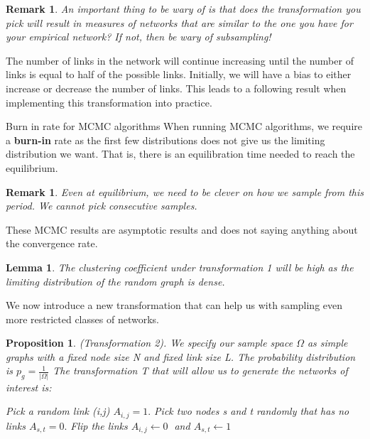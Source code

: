 \documentclass[twoside]{article}
\newtheorem{lemma}[theorem]{Lemma}
\newtheorem{proposition}[theorem]{Proposition}
\newtheorem{remark}[theorem]{Remark}
\begin{document}
\begin{remark} An important thing to be wary of is that does the transformation you pick will result in measures of networks that are similar to the one you have for your empirical network? If not, then be wary of subsampling!
\end{remark}

The number of links in the network will continue increasing until the number of links is equal to half of the possible links. Initially, we will have a bias to either increase or decrease the number of links. This leads to a following result when implementing this transformation into practice.
\begin{proposition_exam}{Burn in rate for MCMC algorithms}{} When running MCMC algorithms, we require a \textbf{burn-in} rate as the first few distributions does not give us the limiting distribution we want. That is, there is an equilibration time needed to reach the equilibrium.
\end{proposition_exam}

\begin{remark} Even at equilibrium, we need to be clever on how we sample from this period. We cannot pick consecutive samples.
\end{remark}

These MCMC results are asymptotic results and does not saying anything about the convergence rate. 

\begin{lemma} The clustering coefficient under transformation 1 will be high as the limiting distribution of the random graph is dense.
\end{lemma}

We now introduce a new transformation that can help us with sampling even more restricted classes of networks.

\begin{proposition}(Transformation 2). We specify our sample space $\Omega$ as simple graphs with a fixed node size N and fixed link size L. The probability distribution is $p_g = \frac{1}{|\Omega|}$ The transformation T that will allow us to generate the networks of interest is:
\begin{algorithm}
\DontPrintSemicolon
Pick a random link (i,j) $A_{i,j} = 1.$\;
Pick two nodes s and t randomly that has no links $A_{s,t} = 0.$\;
Flip the links
$A_{i,j} \gets 0\;$ and 
$A_{s,t} \gets 1\;$
\caption{{\sc Transformation 2}}
\end{algorithm}
\end{proposition}
\end{document}
